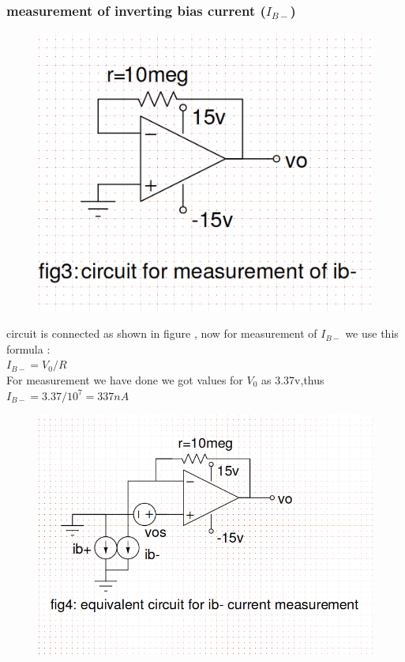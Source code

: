 \documentclass[12pt]{article}
\begin{document}
\subsubsection{ measurement of inverting bias current (\(I_{B-}\))}
\begin{figure}[h!]
\centering
\includegraphics[scale = 0.5]{q1_b_cir.png}
\end{figure}
circuit is connected as shown in figure , now for measurement of \(I_{B-}\) we use this formula :\\
\(I_{B-}=V_{0}/R\)\\
For measurement we have done we got values for \(V_{0}\) as 3.37v,thus\\
\(I_{B-}=3.37/10^{7}=337nA\)\\
\newpage
\begin{figure}[h!]
\centering
\includegraphics[scale = 0.6]{q1_b_ib-.png}
\end{figure}
\newpage
\end{document}
